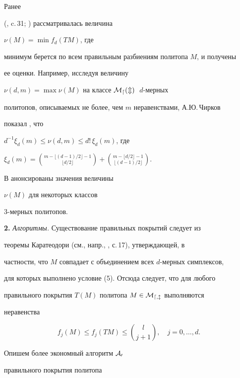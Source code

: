 Ранее


(\cite{S1}, c.\,31; \cite{Chi}) рассматривалась величина


$\nu(M)=\min f_d(TM)$, где


минимум берется по всем правильным разбиениям политопа $M$, и получены


ее оценки. Например, исследуя величину


$\nu(d,m)=\max\nu(M)$ на классе $\cal M_d(m)$ $\;d$-мерных


политопов, описываемых не более, чем $m$ неравенствами, А.Ю.\,Чирков


показал \cite{Chi}, что


$d^{-1}\xi_d(m)\le\nu(d,m)\le d!\,\xi_d(m)$, где


$\xi_d(m)=\binom{m-\lfloor(d-1)/2\rfloor-1}


{\lfloor d/2\rfloor}+\binom{m-\lfloor d/2\rfloor-1}


{\lfloor(d-1)/2\rfloor}$.





В \cite{S2} анонсированы значения величины


$\nu(M)$ для некоторых классов


3-мерных политопов.


\medskip





{\bf 2.} {\it Алгоритмы.} Существование правильных покрытий следует из


теоремы Каратеодори (см., напр., \cite{Em}, с.\,17), утверждающей, в


частности, что $M$ совпадает с объединением всех $d$-мерных симплексов,


для которых выполнено условие (5). Отсюда следует, что для любого


правильного покрытия $T(M)$ политопа $M\in\cal M_{d,l}$ выполняются


неравенства


\begin{equation}


f_j(M)\le f_j(TM)\le\binom{l}{j+1},\quad j=0,\dotsc,d.


\end{equation}





Опишем более экономный алгоритм $\cal A_0$


правильного покрытия политопа


